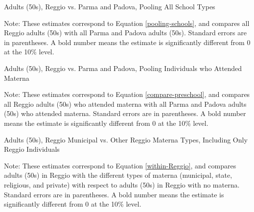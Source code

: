 \documentclass{article}
\begin{document}
\begin{table}[H]
\begin{center}
	\caption{Adults (50s), Reggio vs. Parma and Padova, Pooling All School Types}
	\scalebox{0.9}{
		
		}
\end{center}
\raggedright
\footnotesize
Note: These estimates correspond to Equation \ref{pooling-schools}, and compares all Reggio adults (50s) with all Parma and Padova adults (50s). Standard errors are in parentheses. A bold number means the estimate is significantly different from 0 at the 10\% level. 
\end{table}

\begin{table}[H]
\begin{center}
	\caption{Adults (50s), Reggio vs. Parma and Padova, Pooling Individuals who Attended Materna}
	\scalebox{0.9}{
		
		}
\end{center}
\raggedright
\footnotesize
Note: These estimates correspond to Equation \ref{compare-preschool}, and compares all Reggio adults (50s) who attended materna with all Parma and Padova adults (50s) who attended materna. Standard errors are in parentheses. A bold number means the estimate is significantly different from 0 at the 10\% level. 
\end{table}

\begin{table}[H]
\begin{center}
	\caption{Adults (50s), Reggio Municipal vs. Other Reggio Materna Types, Including Only Reggio Individuals}
		
\end{center}
\raggedright
\footnotesize
Note: These estimates correspond to Equation \ref{within-Reggio}, and compares adults (50s) in Reggio with the different types of materna (municipal, state, religious, and private) with respect to adults (50s) in Reggio with no materna. Standard errors are in parentheses. A bold number means the estimate is significantly different from 0 at the 10\% level. 
\end{table}
\end{document}
